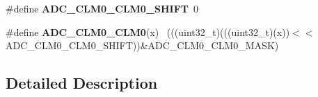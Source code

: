 \begin{DoxyCompactItemize}
\item 
\hypertarget{group___a_d_c___register___masks_gaf5a5fd710a47f83c5ee3fd083f430a66}{}\#define {\bfseries A\+D\+C\+\_\+\+C\+L\+M0\+\_\+\+C\+L\+M0\+\_\+\+S\+H\+I\+F\+T}~0\label{group___a_d_c___register___masks_gaf5a5fd710a47f83c5ee3fd083f430a66}

\item 
\hypertarget{group___a_d_c___register___masks_gaec2ba4c82cc108145d5e6263fbc44bc1}{}\#define {\bfseries A\+D\+C\+\_\+\+C\+L\+M0\+\_\+\+C\+L\+M0}(x)                                              ~(((uint32\+\_\+t)(((uint32\+\_\+t)(x))$<$$<$A\+D\+C\+\_\+\+C\+L\+M0\+\_\+\+C\+L\+M0\+\_\+\+S\+H\+I\+F\+T))\&A\+D\+C\+\_\+\+C\+L\+M0\+\_\+\+C\+L\+M0\+\_\+\+M\+A\+S\+K)\label{group___a_d_c___register___masks_gaec2ba4c82cc108145d5e6263fbc44bc1}

\end{DoxyCompactItemize}


\subsection{Detailed Description}
